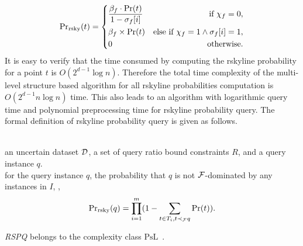 \begin{displaymath}
		{\rm Pr}_{\rm rsky}(t) = \left\{
       	\begin{aligned}
			&\frac{\beta_f\cdot \Pr(t)}{1 - \sigma_f[i]} & \text{if } \chi_f = 0,\\
			&\beta_f \times \Pr(t) & \text{else if } \chi_f = 1 \wedge \sigma_f[i] = 1, \\
			&0 & \text{otherwise}.
		\end{aligned}
		\right.
\end{displaymath}
It is easy to verify that the time consumed by computing the rskyline probability for a point $t$ is $O(2^{d-1}\log{n})$.
Therefore the total time complexity of the multi-level structure based algorithm for all rskyline probabilities computation is $O(2^{d-1}n\log{n})$ time.
This also leads to an algorithm with logarithmic query time and polynomial preprocessing time for rskyline probability query.
The formal definition of rskyline probability query is given as follows.

\\
 an uncertain dataset $\mathcal{D}$, a set of query ratio bound constraints $R$, and a query instance $q$. \\
 for the query instance $q$, the probability that $q$ is not $\mathcal{F}$-dominated by any instances in $I$, \ie,
\[{\rm Pr}_{\rm rsky}(q)= \prod^m_{i = 1} (1 - \sum_{t \in T_i, t \prec_{\mathcal{F}} q}\Pr(t)).\]

\begin{theorem}
	\emph{RSPQ} belongs to the complexity class $\mathrm{PsL}${\rm ~\cite{DBLP:journals/tcs/GaoLML20}}.
\end{theorem}

